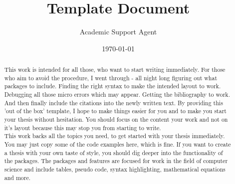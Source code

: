 \documentclass{article}
\title{Template Document}
\author{Academic Support Agent}
\date{\today}
\begin{document}
\maketitle

\setcounter{page}{1}



\pagestyle{fancy}

\setcounter{tocdepth}{1}







\begin{abstract}

This work is intended for all those, who want to start writing immediately. For those who aim to avoid the procedure, I went through - all night long figuring out what packages to include. Finding the right syntax to make the intended layout to work. Debugging all those micro errors which may appear. Getting the bibliography to work. And then finally include the citations into the newly written text. By providing this 'out of the box' template, I hope to make things easier for you and to make you start your thesis without hesitation. You should focus on the content your work and not on it's layout because this may stop you from starting to write.\\
This work backs all the topics you need, to get started with your thesis immediately. You may just copy some of the code examples here, which is fine. If you want to create a thesis with your own taste of style, you should dig deeper into the functionality of the packages. The packages and features are focused for work in the field of computer science and include tables, pseudo code, syntax highlighting, mathematical equations and more.

\end{abstract}


\pagestyle{fancy}

\setcounter{page}{1}


%
%
\end{document}
